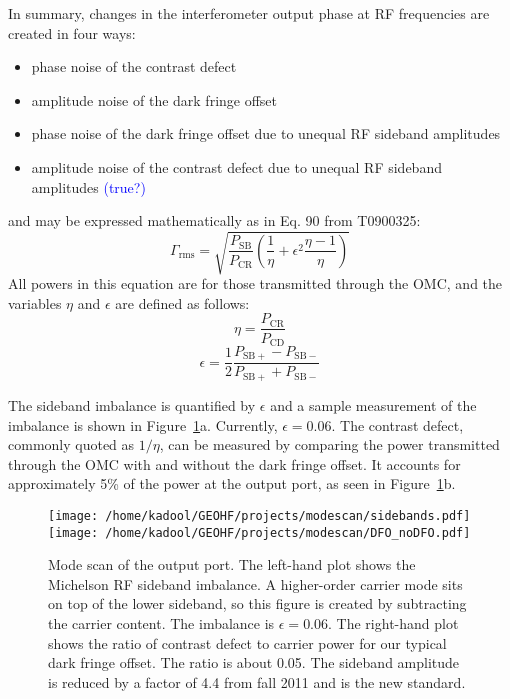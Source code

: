 \documentclass{ligodoc}
\begin{document}
In summary, changes in the interferometer output phase at RF
frequencies are created in four ways:
\begin{itemize}
\item phase noise of the contrast defect
\item amplitude noise of the dark fringe offset 
\item phase noise of the dark fringe offset due to unequal RF sideband amplitudes 
\item amplitude noise of the contrast defect due to unequal RF sideband amplitudes \textcolor{blue}{(true?)}
\end{itemize}
and may be expressed mathematically as in Eq. 90 from T0900325: 
\begin{equation}
\Gamma_{\mathrm{rms}} = \sqrt{\frac{P_{\mathrm{SB}}}{P_{\mathrm{CR}}} \left( \frac{1}{\eta} + \epsilon^2 \frac{\eta-1}{\eta} \right)}
\label{eq:Gammarms}
\end{equation}
All powers in this equation are for those transmitted through the OMC,
and the variables $\eta$ and $\epsilon$ are defined as follows:
\begin{equation}
\eta = \frac{P_{\mathrm{CR}}}{P_{\mathrm{CD}}}
\end{equation}
\begin{equation}
\epsilon = \frac{1}{2}\frac{P_{\mathrm{SB+}}-P_{\mathrm{SB-}}}{P_{\mathrm{SB+}}+P_{\mathrm{SB-}}}
\end{equation}


The sideband imbalance is quantified by $\epsilon$ and a sample
measurement of the imbalance is shown in
Figure~\ref{fig:modescan}a. Currently, $\epsilon=0.06$. The contrast
defect, commonly quoted as $1/\eta$, can be measured by comparing the
power transmitted through the OMC with and without the dark fringe
offset. It accounts for approximately 5\% of the power at the output
port, as seen in Figure~\ref{fig:modescan}b.

\begin{figure}
\begin{centering}
\texttt{[image: /home/kadool/GEOHF/projects/modescan/sidebands.pdf]}\texttt{[image: /home/kadool/GEOHF/projects/modescan/DFO\_noDFO.pdf]}
\caption{Mode scan of the output port. The left-hand plot shows the
  Michelson RF sideband imbalance. A higher-order carrier mode sits on
  top of the lower sideband, so this figure is created by subtracting
  the carrier content. The imbalance is $\epsilon = 0.06$. The
  right-hand plot shows the ratio of contrast defect to carrier power
  for our typical dark fringe offset. The ratio is about 0.05. The
  sideband amplitude is reduced by a factor of 4.4 from fall 2011 and
  is the new standard.}
\label{fig:modescan}
\end{centering}
\end{figure}
\end{document}
